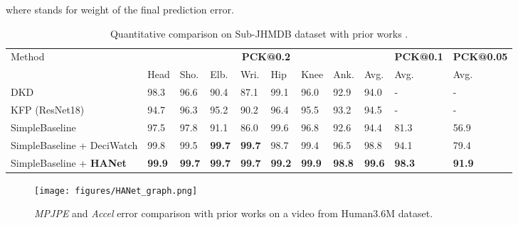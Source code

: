 \documentclass[10pt,twocolumn,letterpaper]{article}
\begin{document}
where  stands for weight of the final prediction error.
 \begin{table*}[t]
\begin{center}
\setlength{\tabcolsep}{5.1pt}
\begin{tabular}{l|llllllll|l|l}
\toprule
\multirow{2}{*}{Method} & \multicolumn{8}{c|}{\textbf{PCK@0.2}} & \multicolumn{1}{c|}{\textbf{PCK@0.1}} & \multicolumn{1}{c}{\textbf{PCK@0.05}} \\  
& Head & Sho.          & Elb. & Wri. & Hip  & Knee & \multicolumn{1}{l|}{Ank.} & Avg. & Avg.                        & Avg.                         \\ \midrule
DKD \cite{dkd} & 98.3 & 96.6          & 90.4 & 87.1 & 99.1 & 96.0 & \multicolumn{1}{l|}{92.9} & 94.0 &                       -      &         -               \\
KFP (ResNet18) \cite{kfp}   & 94.7 & 96.3          & 95.2 & 90.2 & 96.4 & 95.5 & \multicolumn{1}{l|}{93.2} & 94.5 &                       -   &         -              \\ 
SimpleBaseline \cite{simplebaseline} & 97.5 & 97.8          & 91.1 & 86.0 & 99.6 & 96.8 & \multicolumn{1}{l|}{92.6} & 94.4 & 81.3                        & 56.9                         \\
SimpleBaseline + DeciWatch \cite{deciwatch} & 99.8 & 99.5          & \textbf{99.7} & \textbf{99.7} & 98.7 & 99.4 & \multicolumn{1}{l|}{96.5} & 98.8 & 94.1                        & 79.4                         \\ 
SimpleBaseline + \textbf{HANet}     & \textbf{99.9}  & \textbf{99.7} & \textbf{99.7} & \textbf{99.7} & \textbf{99.2} & \textbf{99.9} & \multicolumn{1}{l|}{\textbf{98.8}} & \textbf{99.6} & \textbf{98.3}                        & \textbf{91.9}  \\ \bottomrule    
\end{tabular}
\end{center}
\caption{Quantitative comparison on Sub-JHMDB dataset \cite{jhmdb} with prior works \cite{dkd,kfp,simplebaseline,deciwatch}.}
\label{table:JHMDB set}
\end{table*}

\begin{figure*}[t]
\centering
\texttt{[image: figures/HANet\_graph.png]}
\caption{\textit{MPJPE} and \textit{Accel} error comparison with prior works \cite{fcn,deciwatch} on a video from Human3.6M \cite{h36m} dataset. }
\label{fig:mpjpe error & Accel}
\end{figure*}
\end{document}

